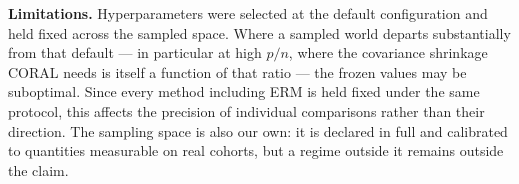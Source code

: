 \textbf{Limitations.}
Hyperparameters were selected at the default configuration and held fixed
across the sampled space. Where a sampled world departs substantially from that
default --- in particular at high $p/n$, where the covariance shrinkage CORAL
needs is itself a function of that ratio --- the frozen values may be
suboptimal. Since every method including ERM is held fixed under the same
protocol, this affects the precision of individual comparisons rather than
their direction. The sampling space is also our own: it is declared in full and
calibrated to quantities measurable on real cohorts, but a regime outside it
remains outside the claim.

%
